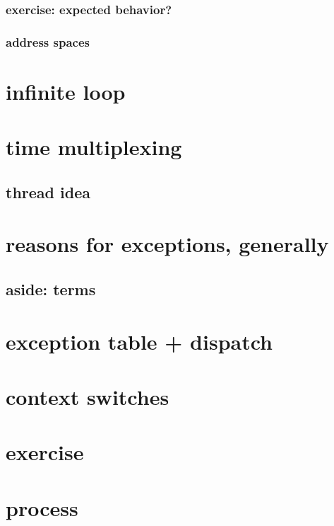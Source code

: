 \subsubsection{exercise: expected behavior?}


\subsubsection{address spaces}


\section{infinite loop}



\section{time multiplexing}


\subsection{thread idea}



\section{reasons for exceptions, generally}



\subsection{aside: terms}


\section{exception table + dispatch}



\section{context switches} %


\section{exercise}


\section{process}


